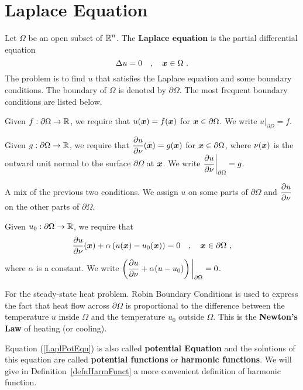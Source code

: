 \chapter{Laplace Equation} \label{ChapLaplace}

Let $\Omega$ be an open subset of $\displaystyle \mathbb{R}^n$.  The
{\bfseries Laplace equation}
is the partial differential equation
\begin{equation} \label{LaplPotEqu}
\Delta u = 0 \quad , \quad {\bm{x}} \in \Omega \ .
\end{equation}
The problem is to find $u$ that satisfies the Laplace equation and some
boundary conditions.  The boundary of $\Omega$ is denoted by
$\partial \Omega$.  The most frequent boundary conditions are listed
below.

 Given
$f:\partial \Omega \rightarrow \mathbb{R}$, we require that
$u({\bm{x}}) = f({\bm{x}})$ for ${\bm{x}} \in \partial \Omega$.  We write
$\displaystyle u\big|_{\partial \Omega} = f$.

 Given
$g:\partial \Omega \rightarrow \mathbb{R}$, we require that
$\displaystyle \frac{\partial{u}}{\partial \nu}({\bm{x}}) = g({\bm{x}})$
for ${\bm{x}} \in \partial \Omega$, where $\nu({\bm{x}})$ is the
outward unit normal to the surface $\partial \Omega$ at ${\bm{x}}$.  We write
$\displaystyle \frac{\partial{u}}{\partial \nu} \bigg|_{\partial \Omega} = g$.

 A mix of the previous two conditions.
We assign $u$ on some parts of $\partial \Omega$ and
$\displaystyle \frac{\partial{u}}{\partial \nu}$ on the other parts of $\partial \Omega$.

 Given
$u_0:\partial \Omega \rightarrow \mathbb{R}$, we require that
\[
\pdydx{u}{\nu}(\VEC{x}) + \alpha \left( u(\VEC{x})
- u_0(\VEC{x}) \right) = 0 \quad , \quad \VEC{x} \in \partial \Omega \ ,
\]
where $\alpha$ is a constant.  We write
$\displaystyle \left( \frac{\partial{u}}{\partial \nu} +
\alpha (u - u_0)\right)\bigg|_{\partial \Omega} = 0$.

For the steady-state heat problem.  Robin Boundary Conditions is used
to express the fact that heat flow across $\partial \Omega$ is
proportional to the difference between the temperature $u$ inside
$\Omega$ and the temperature $u_0$ outside $\Omega$.  This is the
{\bfseries Newton's Law} of heating
(or cooling).

Equation (\ref{LaplPotEqu}) is also called
{\bfseries potential Equation} and the
solutions of this equation are called
{\bfseries potential functions} or
{\bfseries harmonic functions}.  We will
give in Definition~\ref{defnHarmFunct} a more convenient definition of
harmonic function.

